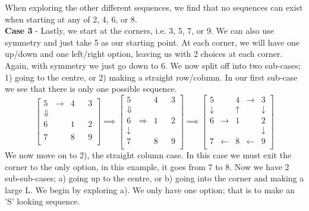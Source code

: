 \documentclass[11pt]{article}
\newcommand{\keywordfont}{\textsc}
\newcommand{\keyword}[1]{%
  \marginpar{\raggedright\small\keywordfont{#1}}}
\begin{document}
When exploring the other different sequences, we find that no \keyword{AHA}sequences can exist when starting at any of 2, 4, 6, or 8.
\\ \textbf{Case 3} -\keyword{Justify} Lastly, we start at the corners, i.e. 3, 5, 7, or 9. We can also use symmetry and just take 5 as our starting point. At each corner, we will have one up/down and one left/right option, leaving us with 2 choices at each corner. Again, with symmetry we just go down to 6. We now split off into two sub-cases; 1) going to the centre, or 2) making a straight row/column. In our first sub-case we see that there is only one possible sequence.
\[
\begin{bmatrix}
5 & \rightarrow & 4 & & 3\\
\Downarrow  & & & & \\
6 & & 1 & & 2\\
  & &  & & \\
7 & & 8 & & 9\\
\end{bmatrix} \implies
\begin{bmatrix}
5 & & 4 & & 3\\
\Downarrow  & & & & \\
6 & \Rightarrow & 1 & & 2\\
\downarrow  & &  & & \\
7 & & 8 & & 9\\
\end{bmatrix} \implies
\begin{bmatrix}
5 & & 4 & \rightarrow & 3\\
\downarrow & & \uparrow & & \downarrow \\
6 & \rightarrow & 1 & & 2\\
 & &  & & \downarrow \\
7 & \leftarrow & 8 & \leftarrow & 9\\
\end{bmatrix}
\]
We now move \keyword{Justify}on to 2), the straight column case. In this case we must exit the corner to the only option, in this example, it goes from 7 to 8. Now we have 2 sub-sub-cases; a) going up to the centre, or b) going into the corner and making a large L. We begin by exploring a). We only have one option; that is to make an 'S' looking sequence. 
\end{document}
